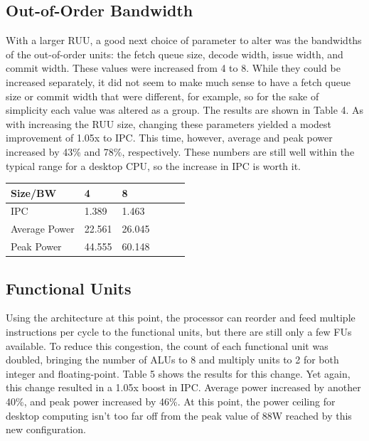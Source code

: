 \documentclass[english]{article}
\begin{document}
\subsection{Out-of-Order Bandwidth}
With a larger RUU, a good next choice of parameter to alter was the bandwidths of the out-of-order units: the fetch queue size, decode width, issue width, and commit width. These values were increased from 4 to 8. While they could be increased separately, it did not seem to make much sense to have a fetch queue size or commit width that were different, for example, so for the sake of simplicity each value was altered as a group. The results are shown in Table 4. As with increasing the RUU size, changing these parameters yielded a modest improvement of 1.05x to IPC. This time, however, average and peak power increased by 43\% and 78\%, respectively. These numbers are still well within the typical range for a desktop CPU, so the increase in IPC is worth it.

\begin{center}
	\vspace{.30cm}
	\begin{tabular}{ | l | l | l | l | l | l |}
		\hline
	 Size/BW & 4 & 8 \\ \hline
     IPC & 1.389 & 1.463 \\ \hline
     Average Power & 22.561 & 26.045 \\ \hline
     Peak Power & 44.555 & 60.148 \\ \hline
	\end{tabular}
\end{center}

\subsection{Functional Units}
Using the architecture at this point, the processor can reorder and feed multiple instructions per cycle to the functional units, but there are still only a few FUs available. To reduce this congestion, the count of each functional unit was doubled, bringing the number of ALUs to 8 and multiply units to 2 for both integer and floating-point. Table 5 shows the results for this change. Yet again, this change resulted in a 1.05x boost in IPC. Average power increased by another 40\%, and peak power increased by 46\%. At this point, the power ceiling for desktop computing isn't too far off from the peak value of 88W reached by this new configuration.
\end{document}
